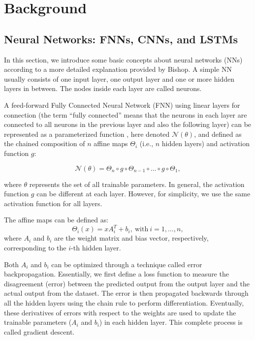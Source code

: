 \chapter{Background}\label{chap:background}


\section{Neural Networks: FNNs, CNNs, and LSTMs}

In this section, we introduce some basic concepts about neural networks (NNs) according to a more detailed explanation provided by Bishop. \citep{10.1117_1.2819119} A simple NN usually consists of one input layer, one output layer and one or more hidden layers in between. The nodes inside each layer are called neurons. 

A feed-forward Fully Connected Neural Network (FNN) using linear layers for connection (the term ``fully connected'' means that the neurons in each layer are connected to all neurons in the previous layer and also the following layer) can be represented as a parameterized function \citep{2306.06304}, here denoted $\mathcal{N}(\theta)$, and defined as the chained composition of $n$ affine maps $\Theta_i$ (i.e., $n$ hidden layers) and activation function $g$:

\begin{equation*}
\mathcal{N}(\theta) = \Theta_n \circ g \circ \Theta_{n-1} \circ \ldots \circ g \circ \Theta_1,
\end{equation*}

where $\theta$ represents the set of all trainable parameters. In general, the activation function $g$ can be
different at each layer. However, for simplicity, we use the same activation function for all layers.

The affine maps can be defined as:
\begin{equation*} 
\Theta_i(x) = xA_i^{T} + b_i, \ \mathrm{with} \ i=1,\ldots,n, 
\end{equation*}
where $A_i$ and $b_i$ are the weight matrix and bias vector, respectively, corresponding to the $i$-th hidden layer.

Both $A_i$ and $b_i$ can be optimized through a technique called error backpropagation. Essentially, we first define a loss function to measure the disagreement (error) between the predicted output from the output layer and the actual output from the dataset. The error is then propagated backwards through all the hidden layers using the chain rule to perform differentiation. Eventually, these derivatives of errors with respect to the weights are used to update the trainable parameters ($A_i$ and $b_i$) in each hidden layer. This complete process is called gradient descent. 

